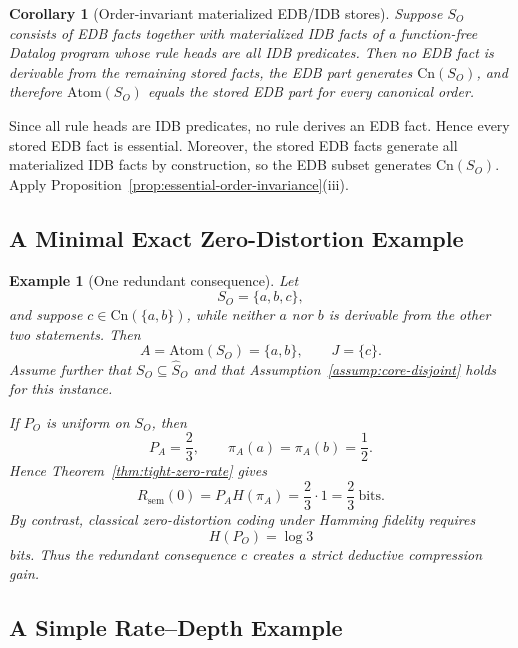 \documentclass[journal,onecolumn]{IEEEtran}
\makeatletter
\newcommand{\Atom}{\text{Atom}}
\newcommand{\Cn}{\text{Cn}}
\newtheorem{corollary}{Corollary}[section]
\newtheorem{example}{Example}[section]
\numberwithin{equation}{section}
\renewenvironment{proof}[1][\proofname]{\par
  \pushQED{\qed}%
  \normalfont \topsep6\p@\@plus6\p@\relax
  \trivlist
  \item[\hskip\labelsep
        \itshape
    #1\@addpunct{.}]\ignorespaces
}{%
  \popQED\endtrivlist\@endpefalse
}
\makeatother
\begin{document}
\begin{corollary}[Order-invariant materialized EDB/IDB stores]
\label{cor:edb-idb-order-invariant}
Suppose \(S_O\) consists of EDB facts together with materialized IDB
facts of a function-free Datalog program whose rule heads are all IDB
predicates.
Then no EDB fact is derivable from the remaining stored facts, the EDB
part generates \(\Cn(S_O)\), and therefore \(\Atom(S_O)\) equals the
stored EDB part for every canonical order.
\end{corollary}

\begin{proof}
Since all rule heads are IDB predicates, no rule derives an EDB fact.
Hence every stored EDB fact is essential.
Moreover, the stored EDB facts generate all materialized IDB facts by
construction, so the EDB subset generates \(\Cn(S_O)\).
Apply Proposition~\ref{prop:essential-order-invariance}(iii).
\end{proof}

\subsection{A Minimal Exact Zero-Distortion Example}
\label{app:example-zero-rate}

\begin{example}[One redundant consequence]
\label{ex:minimal-zero-rate}
Let
\[
  S_O=\{a,b,c\},
\]
and suppose \(c\in\Cn(\{a,b\})\), while neither \(a\) nor \(b\) is
derivable from the other two statements.
Then
\[
  A=\Atom(S_O)=\{a,b\},
  \qquad
  J=\{c\}.
\]
Assume further that \(S_O\subseteq\hat S_O\) and that
Assumption~\ref{assump:core-disjoint} holds for this instance.

If \(P_O\) is uniform on \(S_O\), then
\[
  P_A=\frac{2}{3},
  \qquad
  \pi_A(a)=\pi_A(b)=\frac{1}{2}.
\]
Hence Theorem~\ref{thm:tight-zero-rate} gives
\[
  R_{\mathrm{sem}}(0)
  =
  P_AH(\pi_A)
  =
  \frac{2}{3}\cdot 1
  =
  \frac{2}{3}\ \text{bits}.
\]
By contrast, classical zero-distortion coding under Hamming fidelity
requires
\[
  H(P_O)=\log 3
\]
bits. Thus the redundant consequence \(c\) creates a strict
deductive compression gain.
\end{example}

\subsection{A Simple Rate--Depth Example}
\label{app:example-rate-depth}
\end{document}

